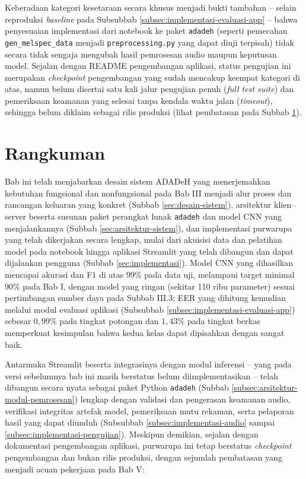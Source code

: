 Keberadaan kategori kesetaraan secara khusus menjadi bukti tambahan -- selain
reproduksi \textit{baseline} pada Subsubbab \ref{subsec:implementasi-evaluasi-app}
-- bahwa penyesuaian implementasi dari notebook ke paket \texttt{adadeh} (seperti
pemecahan \texttt{gen\_melspec\_data} menjadi \texttt{preprocessing.py} yang
dapat diuji terpisah) tidak secara tidak sengaja mengubah hasil pemrosesan audio
maupun keputusan model. Sejalan dengan README pengembangan aplikasi, status
pengujian ini merupakan \textit{checkpoint} pengembangan yang sudah mencakup
keempat kategori di atas, namun belum disertai satu kali jalur pengujian penuh
(\textit{full test suite}) dan pemeriksaan keamanan yang selesai tanpa kendala
waktu jalan (\textit{timeout}), sehingga belum diklaim sebagai rilis produksi
(lihat pembatasan pada Subbab \ref{sec:rangkuman-bab-iv}).

\section{Rangkuman}
\label{sec:rangkuman-bab-iv}

Bab ini telah menjabarkan desain sistem ADADeH yang menerjemahkan kebutuhan
fungsional dan nonfungsional pada Bab III menjadi alur proses dan rancangan
keluaran yang konkret (Subbab \ref{sec:desain-sistem}), arsitektur klien--server
beserta susunan paket perangkat lunak \texttt{adadeh} dan model CNN yang
menjalankannya (Subbab \ref{sec:arsitektur-sistem}), dan implementasi purwarupa
yang telah dikerjakan secara lengkap, mulai dari akuisisi data dan pelatihan
model pada notebook hingga aplikasi Streamlit yang telah dibangun dan dapat
dijalankan pengguna (Subbab \ref{sec:implementasi}). Model CNN yang dihasilkan
mencapai akurasi dan F1 di atas $99\%$ pada data uji, melampaui target minimal
$90\%$ pada Bab I, dengan model yang ringan (sekitar 110 ribu parameter) sesuai
pertimbangan sumber daya pada Subbab III.3; EER yang dihitung kemudian melalui
modul evaluasi aplikasi (Subsubbab \ref{subsec:implementasi-evaluasi-app})
sebesar $0{,}99\%$ pada tingkat potongan dan $1{,}43\%$ pada tingkat berkas
memperkuat kesimpulan bahwa kedua kelas dapat dipisahkan dengan sangat baik.

Antarmuka Streamlit beserta integrasinya dengan modul inferensi -- yang pada
versi sebelumnya bab ini masih berstatus belum diimplementasikan -- telah
dibangun secara nyata sebagai paket Python \texttt{adadeh} (Subbab
\ref{subsec:arsitektur-modul-pemrosesan}) lengkap dengan validasi dan pengerasan
keamanan audio, verifikasi integritas artefak model, pemeriksaan mutu rekaman,
serta pelaporan hasil yang dapat diunduh (Subsubbab
\ref{subsec:implementasi-audio} sampai \ref{subsec:implementasi-pengujian}).
Meskipun demikian, sejalan dengan dokumentasi pengembangan aplikasi, purwarupa
ini tetap berstatus \textit{checkpoint} pengembangan dan bukan rilis produksi,
dengan sejumlah pembatasan yang menjadi acuan pekerjaan pada Bab V:

